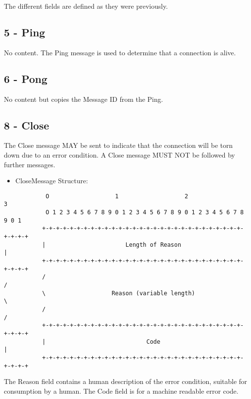 The different fields are defined as they were previously.


\subsection{5 - Ping}
No content. The Ping message is used to determine that a connection is
alive.

\subsection{6 - Pong}
No content but copies the Message ID from the Ping.

\subsection{8 - Close}

The Close message MAY be sent to indicate that the connection will be
torn down due to an error condition. A Close message MUST NOT be
followed by further messages.

\begin{itemize}
 \item CloseMessage Structure: 
\end{itemize}
 
\begin{verbatim}
            O                   1                   2                   3
            O 1 2 3 4 5 6 7 8 9 0 1 2 3 4 5 6 7 8 9 0 1 2 3 4 5 6 7 8 9 0 1
           +-+-+-+-+-+-+-+-+-+-+-+-+-+-+-+-+-+-+-+-+-+-+-+-+-+-+-+-+-+-+-+-+
           |                       Length of Reason                        |
           +-+-+-+-+-+-+-+-+-+-+-+-+-+-+-+-+-+-+-+-+-+-+-+-+-+-+-+-+-+-+-+-+
           /                                                               /
           \                   Reason (variable length)                    \
           /                                                               /
           +-+-+-+-+-+-+-+-+-+-+-+-+-+-+-+-+-+-+-+-+-+-+-+-+-+-+-+-+-+-+-+-+
           |                             Code                              |
           +-+-+-+-+-+-+-+-+-+-+-+-+-+-+-+-+-+-+-+-+-+-+-+-+-+-+-+-+-+-+-+-+
\end{verbatim}


The Reason field contains a human description of the error condition,
suitable for consumption by a human. The Code field is for a machine
readable error code.